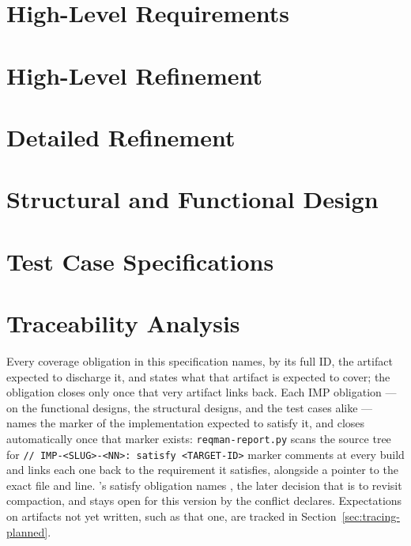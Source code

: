 \documentclass[a4paper]{report}
\begin{document}
\chapter{High-Level Requirements}




\chapter{High-Level Refinement}


\chapter{Detailed Refinement}


\chapter{Structural and Functional Design}


\chapter{Test Case Specifications}


\chapter{Traceability Analysis}

Every coverage obligation in this specification names, by its full ID, the
artifact expected to discharge it, and states what that artifact is expected
to cover; the obligation closes only once that very artifact links back.
Each \textsf{IMP} obligation --- on the functional designs, the structural
designs, and the test cases alike --- names the marker of the implementation
expected to satisfy it, and closes automatically once that marker exists:
\texttt{reqman-report.py} scans the source tree for
\texttt{// IMP-<SLUG>-<NN>: satisfy <TARGET-ID>} marker comments at every build
and links each one back to the requirement it satisfies, alongside a pointer to
the exact file and line. 's satisfy
obligation names , the later decision
that is to revisit compaction, and stays open for this version by the conflict
 declares. Expectations on artifacts not
yet written, such as that one, are tracked in
Section~\ref{sec:tracing-planned}.
\end{document}
